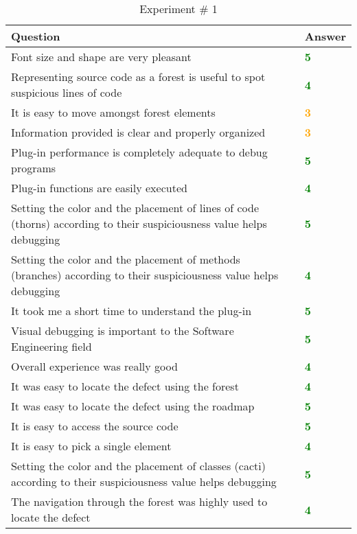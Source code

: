 \begin{table}
\caption{Experiment \# 1}
\begin{tabular}{m{11cm} | l}
    \textbf{Question} & \textbf{Answer}\\
    \hline
    Font size and shape are very pleasant & \textbf{\textcolor{green}{5}} \\ \hline
    Representing source code as a forest is useful to spot suspicious lines of code & \textbf{\textcolor{green}{4}} \\ \hline
    It is easy to move amongst forest elements & \textbf{\textcolor{orange}{3}} \\ \hline
    Information provided is clear and properly organized & \textbf{\textcolor{orange}{3}} \\ \hline
    Plug-in performance is completely adequate to debug programs & \textbf{\textcolor{green}{5}} \\ \hline
    Plug-in functions are easily executed & \textbf{\textcolor{green}{4}} \\ \hline
    Setting the color and the placement of lines of code (thorns) according to their suspiciousness value helps debugging & \textbf{\textcolor{green}{5}} \\ \hline
    Setting the color and the placement of methods (branches) according to their suspiciousness value helps debugging & \textbf{\textcolor{green}{4}} \\ \hline
    It took me a short time to understand the plug-in & \textbf{\textcolor{green}{5}} \\ \hline
    Visual debugging is important to the Software Engineering field & \textbf{\textcolor{green}{5}} \\ \hline
    Overall experience was really good & \textbf{\textcolor{green}{4}} \\ \hline
    It was easy to locate the defect using the forest & \textbf{\textcolor{green}{4}} \\ \hline
    It was easy to locate the defect using the roadmap &
    \textbf{\textcolor{green}{5}} \\ \hline It is easy to access the source code & \textbf{\textcolor{green}{5}} \\ \hline
    It is easy to pick a single element & \textbf{\textcolor{green}{4}} \\ \hline
    Setting the color and the placement of classes (cacti) according to their
    suspiciousness value helps debugging & \textbf{\textcolor{green}{5}} \\ \hline The navigation through the forest was highly used to locate the defect & \textbf{\textcolor{green}{4}} \\ \hline

\end{tabular}
\end{table}
